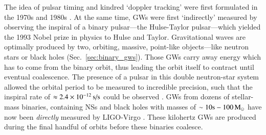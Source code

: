 \documentclass[onecolumn,authoryear]{els-mrw}
\begin{document}
The idea of pulsar timing and kindred `doppler tracking' were first formulated in the 1970s and 1980s \citep{Estabrook+Wahlquist-1975, Sazhin-1978, Detweiler-1979, Hellings+Downs-1983}.  At the same time, GWs were first `indirectly' measured by observing the inspiral of a binary pulsar---the Hulse-Taylor pulsar---which yielded the 1993 Nobel prize in physics to Hulse and Taylor.  Gravitational waves are optimally produced by two, orbiting, massive, point-like objects---like neutron stars or black holes (Sec.~\ref{sec:binary_gws}).  Those GWs carry away energy which has to come from the binary orbit, thus leading the orbit itself to contract until eventual coalescence.  The presence of a pulsar in this double neutron-star system allowed the orbital period to be measured to incredible precision, such that the inspiral rate of $\approx 2.4\times\nobreak10^{-12} \, \textrm{s/s}$ could be observed \citep{Weisberg+2010}.  GWs from dozens of stellar-mass binaries, containing NSs and black holes with masses of $\sim 10\rm{s} - 100 \, \textrm{M}_{\odot}$ have now been \textit{directly} measured by LIGO-Virgo \citep{LVK-2023}.  These kilohertz GWs are produced during the final handful of orbits before these binaries coalesce.
\end{document}
